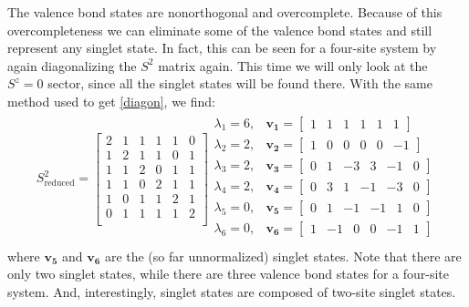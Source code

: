 The valence bond states are nonorthogonal and overcomplete.
Because of this overcompleteness we can eliminate some of the valence bond states and still
represent any singlet state.  
In fact, this can be seen for a four-site system by again diagonalizing the $S^2$ matrix again.
This time we will only look at the $S^z=0$ sector, since all the singlet states will be found there.
With the same method used to get \eqref{diagon}, we find:
\begin{eqnarray}
S^2_{\text{reduced}} =\left[
\begin{array}{cccccc}
2&1&1&1&1&0\\
1&2&1&1&0&1\\
1&1&2&0&1&1\\
1&1&0&2&1&1\\
1&0&1&1&2&1\\
0&1&1&1&1&2\\
\end{array} \right] 
\begin{array}{cl}
\lambda_1=6,&\mathbf{v_1} =\left[\begin{array}{cccccc} 1&1&1&1&1&1\end{array} \right]\\
\lambda_2=2,&\mathbf{v_2} =\left[\begin{array}{cccccc} 1&0&0&0&0&-1\end{array} \right]\\
\lambda_3=2,&\mathbf{v_3} =\left[\begin{array}{cccccc} 0&1&-3&3&-1&0\end{array} \right]\\
\lambda_4=2,&\mathbf{v_4} =\left[\begin{array}{cccccc} 0&3&1&-1&-3&0\end{array} \right]\\
\lambda_5=0,&\mathbf{v_5} =\left[\begin{array}{cccccc} 0&1&-1&-1&1&0\end{array} \right]\\
\lambda_6=0,&\mathbf{v_6} =\left[\begin{array}{cccccc} 1&-1&0&0&-1&1\end{array} \right]\\
\end{array} 
\end{eqnarray}
where $\mathbf{v_5}$ and $\mathbf{v_6}$ are the (so far unnormalized) singlet states.
Note that there are only two singlet states, while there are three valence bond states
for a four-site system.
And, interestingly, singlet states are composed of two-site singlet states. 
